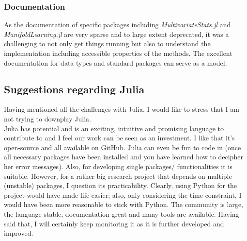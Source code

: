 \documentclass[journal, a4paper]{IEEEtran}
\begin{document}
\subsubsection{Documentation}
As the documentation of specific packages including \textit{MultivariateStats.jl} and \textit{ManifoldLearning.jl} are very sparse and to large extent deprecated, it was a challenging to not only get things running but also to understand the implementation including accessible properties of the methods. The excellent documentation for data types and standard packages can serve as a model. \\


\subsection{Suggestions regarding Julia}\label{suggestionsjulia}
Having mentioned all the challenges with Julia, I would like to stress that I am not trying to downplay Julia. \\

Julia has potential and is an exciting, intuitive and promising language to contribute to and I feel our work can be seen as an investment. I like that it's open-source and all available on GitHub. Julia can even be fun to code in (once all necessary packages have been installed and you have learned how to decipher her error messages). Also, for developing single packages/ functionalities it is suitable. However, for a rather big research project that depends on multiple (unstable) packages, I question its practicability.
Clearly, using Python for the project would have made life easier; also, only considering the time constraint, I would have been more reasonable to stick with Python. The community is large, the language stable, documentation great and many tools are available. 
Having said that, I will certainly keep monitoring it as it is further developed and improved. \\
\end{document}
